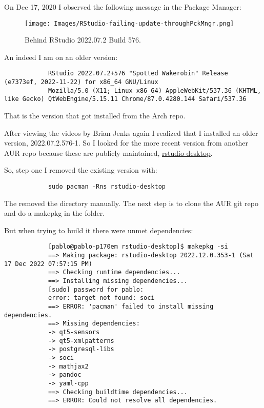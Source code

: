 \documentclass[]{scrartcl}
\begin{document}
	On Dec 17, 2020 I observed the following message in the Package Manager:
	
	\begin{figure}[!htb]
		\centering
		\caption{Behind RStudio 2022.07.2 Build 576.}
		\texttt{[image: Images/RStudio-failing-update-throughPckMngr.png]}
	\end{figure}
	
	An indeed I am on an older version:
	\begin{tiny}
		\begin{verbatim}
			RStudio 2022.07.2+576 "Spotted Wakerobin" Release (e7373ef, 2022-11-22) for x86_64 GNU/Linux
			Mozilla/5.0 (X11; Linux x86_64) AppleWebKit/537.36 (KHTML, like Gecko) QtWebEngine/5.15.11 Chrome/87.0.4280.144 Safari/537.36
		\end{verbatim}
	\end{tiny}
	
	That is the version that got installed from the Arch repo.
	
	After viewing the videos by Brian Jenks again I realized that I installed an older version, 2022.07.2.576-1. So I looked for the  more recent version from another AUR repo because these are
	publicly maintained, \href{https://aur.archlinux.org/packages/rstudio-desktop}{rstudio-desktop}.
	
	So, step one I removed the existing version with:
	
	\begin{small}
		\begin{verbatim}
			sudo pacman -Rns rstudio-desktop	
		\end{verbatim}
	\end{small}
	
	
	The removed the directory manually.
	The next step is to clone the AUR git repo and do a makepkg in the folder.
	
	But when trying to build it there were unmet dependencies:
	
	\begin{tiny}
		\begin{verbatim}
			[pablo@pablo-p170em rstudio-desktop]$ makepkg -si
			==> Making package: rstudio-desktop 2022.12.0.353-1 (Sat 17 Dec 2022 07:57:15 PM)
			==> Checking runtime dependencies...
			==> Installing missing dependencies...
			[sudo] password for pablo: 
			error: target not found: soci
			==> ERROR: 'pacman' failed to install missing dependencies.
			==> Missing dependencies:
			-> qt5-sensors
			-> qt5-xmlpatterns
			-> postgresql-libs
			-> soci
			-> mathjax2
			-> pandoc
			-> yaml-cpp
			==> Checking buildtime dependencies...
			==> ERROR: Could not resolve all dependencies.
		\end{verbatim}
	\end{tiny}
	
\end{document}
